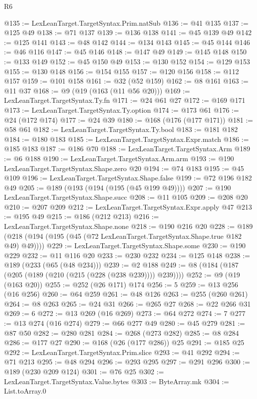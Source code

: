 \begin{lexlean}{R6}
\begin{coremodule}
@135 := LexLeanTarget.TargetSyntax.Prim.natSub
@136 := @41 @135
@137 := @125 @49
@138 := @71 @137
@139 := @136 @138
@141 := @45 @139 @49
@142 := @125 @141
@143 := @48 @142
@144 := @134 @143
@145 := @45 @144
@146 := @46 @116
@147 := @45 @146
@148 := @147 @49
@149 := @145 @148
@150 := @133 @149
@152 := @45 @150 @49
@153 := @130 @152
@154 := @129 @153
@155 := @130 @148
@156 := @154 @155
@157 := @120 @156
@158 := @112 @157
@159 := @101 @158
@161 := @32 (@52 @159)
@162 := @8 @161
@163 := @11 @37
@168 := @9 (@19 (@163 (@11 @56 @20)))
@169 := LexLeanTarget.TargetSyntax.Ty.fn
@171 := @24 @61 @27
@172 := @169 @171
@173 := LexLeanTarget.TargetSyntax.Ty.option
@174 := @173 @61
@176 := @24 (@172 @174)
@177 := @24 @39
@180 := @168 (@176 (@177 @171))
@181 := @58 @61
@182 := LexLeanTarget.TargetSyntax.Ty.bool
@183 := @181 @182
@184 := @180 @183
@185 := LexLeanTarget.TargetSyntax.Expr.match
@186 := @185 @183
@187 := @186 @70
@188 := LexLeanTarget.TargetSyntax.Arm
@189 := @6 @188
@190 := LexLeanTarget.TargetSyntax.Arm.arm
@193 := @190 LexLeanTarget.TargetSyntax.Shape.zero @20
@194 := @74 @183
@195 := @45 @109
@196 := LexLeanTarget.TargetSyntax.Shape.false
@199 := @72 @196 @182 @49
@205 := @189 (@193 (@194 (@195 (@45 @199 @49))))
@207 := @190 LexLeanTarget.TargetSyntax.Shape.succ
@208 := @11 @105
@209 := @208 @20
@210 := @207 @209
@212 := LexLeanTarget.TargetSyntax.Expr.apply @47
@213 := @195 @49
@215 := @186 (@212 @213)
@216 := LexLeanTarget.TargetSyntax.Shape.none
@218 := @190 @216 @20
@228 := @189 (@218 (@194 (@195 (@45 (@72 LexLeanTarget.TargetSyntax.Shape.true @182 @49) @49))))
@229 := LexLeanTarget.TargetSyntax.Shape.some
@230 := @190 @229
@232 := @11 @116 @20
@233 := @230 @232
@234 := @125 @148
@238 := @189 (@233 (@65 (@48 @234)))
@239 := @2 @188
@249 := @8 (@184 (@187 (@205 (@189 (@210 (@215 (@228 (@238 @239)))) @239))))
@252 := @9 (@19 (@163 @20))
@255 := @252 (@26 @171) @174
@256 := 5
@259 := @13 @256 (@16 @256)
@260 := @64 @259
@261 := @48 @126
@263 := @255 (@260 @261)
@264 := @8 @263
@265 := @24 @31
@266 := @265 @27
@268 := @22 @266 @31
@269 := 6
@272 := @13 @269 (@16 @269)
@273 := @64 @272
@274 := 7
@277 := @13 @274 (@16 @274)
@279 := @66 @277 @49
@280 := @45 @279
@281 := @87 @50
@282 := @280 @281
@284 := @268 (@273 @282)
@285 := @8 @284
@286 := @177 @27
@290 := @168 (@26 (@177 @286)) @25
@291 := @185 @25
@292 := LexLeanTarget.TargetSyntax.Prim.slice
@293 := @41 @292
@294 := @71 @213
@295 := @48 @294
@296 := @293 @295
@297 := @291 @296
@300 := @189 (@230 @209 @124)
@301 := @76 @25
@302 := LexLeanTarget.TargetSyntax.Value.bytes
@303 := ByteArray.mk
@304 := List.toArray.{0}

\end{coremodule}
\end{lexlean}
